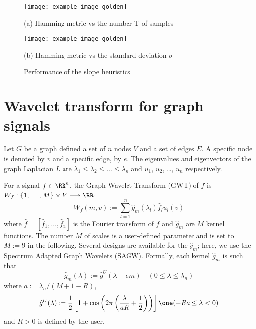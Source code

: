 \documentclass[11pt]{article}
\begin{document}
\begin{solution}
\begin{figure}
    \centering
    \begin{minipage}[t]{0.45\textwidth}
    \centerline{\texttt{[image: example-image-golden]}}
    \centerline{(a) Hamming metric vs the number T of samples}
    \end{minipage}
    \hfill
    \begin{minipage}[t]{0.45\textwidth}    \centerline{\texttt{[image: example-image-golden]}}
    \centerline{(b) Hamming metric vs the standard deviation $\sigma$}
    \end{minipage}
    \caption{Performance of the slope heuristics}\label{fig:simulation-slope}
\end{figure}
\end{solution}


\newpage
\section{Wavelet transform for graph signals}
Let $G$ be a graph defined a set of $n$ nodes $V$ and a set of edges $E$. A specific node is denoted by $v$ and a specific edge, by $e$.
The eigenvalues and eigenvectors of the graph Laplacian $L$ are $\lambda_1\leq\lambda_2\leq\dots\leq \lambda_n$ and $u_1$, $u_2$, \dots, $u_n$ respectively.

For a signal $f\in\RR^{n}$, the Graph Wavelet Transform (GWT) of $f$ is $ W_f: \{1,\dots,M\}\times V \longrightarrow \RR$:
\begin{equation}
    W_f(m, v) := \sum_{l=1}^n \hat{g}_m(\lambda_l)\hat{f}_l u_l(v)
\end{equation}
where $\hat{f}= [\hat{f}_1,\dots,\hat{f}_n]$ is the Fourier transform of $f$ and $\hat{g}_m$ are $M$ kernel functions.
The number $M$ of scales is a user-defined parameter and is set to $M:=9$ in the following.
Several designs are available for the $\hat{g}_m$; here, we use the Spectrum Adapted Graph Wavelets (SAGW).
Formally, each kernel $\hat{g}_m$ is such that
\begin{equation}
    \hat{g}_m(\lambda) := \hat{g}^U(\lambda - am) \quad (0\leq\lambda\leq\lambda_n)
\end{equation}
where $a:=\lambda_n / (M+1-R)$,
\begin{equation}
    \hat{g}^U(\lambda) := \frac{1}{2}\left[ 1 + \cos\left( 2\pi\left(\frac{\lambda}{a R}  + \frac{1}{2} \right)\right) \right]\one(-Ra \leq \lambda < 0)
\end{equation}
and $R>0$ is defined by the user.
\end{document}

